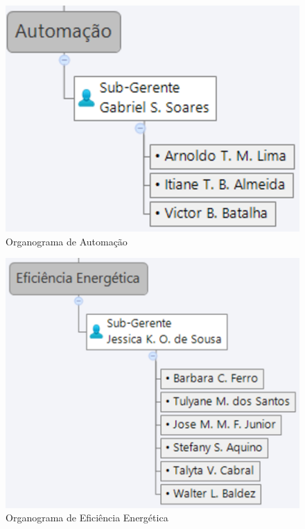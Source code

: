 \begin{figure}[H]
  \begin{center}
	\includegraphics[keepaspectratio,scale=0.6]{figuras/automacao.eps}
	\caption{Organograma de Automação}
  \end{center}
\end{figure}

\begin{figure}[H]
  \begin{center}
	\includegraphics[keepaspectratio,scale=0.6]{figuras/eficiencia_energetica.eps}
	\caption{Organograma de Eficiência Energética}
  \end{center}
\end{figure}

